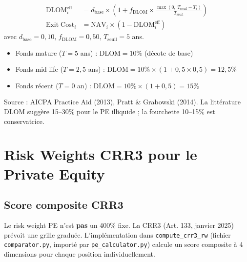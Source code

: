 \documentclass[12pt,a4paper]{article}
\begin{document}
\begin{formulebox}
\begin{align}
\mathrm{DLOM}_i^{\mathrm{eff}} &= d_{\mathrm{base}} \times \left(1 + f_{\mathrm{DLOM}} \times \frac{\max(0,\; T_{\mathrm{seuil}} - T_i)}{T_{\mathrm{seuil}}}\right) \label{eq:dlom}\\[6pt]
\mathrm{Exit\;Cost}_i &= \mathrm{NAV}_i \times (1 - \mathrm{DLOM}_i^{\mathrm{eff}}) \label{eq:exit_cost}
\end{align}
avec $d_{\mathrm{base}} = 0{,}10$, $f_{\mathrm{DLOM}} = 0{,}50$, $T_{\mathrm{seuil}} = 5$ ans.
\end{formulebox}

\begin{interpretbox}
\begin{itemize}[nosep]
    \item Fonds mature ($T = 5$ ans) : $\mathrm{DLOM} = 10\%$ (d\'{e}cote de base)
    \item Fonds mid-life ($T = 2{,}5$ ans) : $\mathrm{DLOM} = 10\% \times (1 + 0{,}5 \times 0{,}5) = 12{,}5\%$
    \item Fonds r\'{e}cent ($T = 0$ an) : $\mathrm{DLOM} = 10\% \times (1 + 0{,}5) = 15\%$
\end{itemize}
Source : AICPA Practice Aid (2013), Pratt \& Grabowski (2014). La litt\'{e}rature
DLOM sugg\`{e}re 15--30\% pour le PE illiquide ; la fourchette 10--15\% est conservatrice.
\end{interpretbox}


\section{Risk Weights CRR3 pour le Private Equity}
\label{sec:crr3}

\subsection{Score composite CRR3}

Le risk weight PE n'est \textbf{pas} un 400\% fixe. La CRR3 (Art. 133, janvier 2025)
pr\'{e}voit une grille gradu\'{e}e. L'impl\'{e}mentation dans \texttt{compute\_crr3\_rw}
(fichier \texttt{comparator.py}, import\'{e} par \texttt{pe\_calculator.py}) calcule un score
composite \`{a} 4 dimensions pour chaque position individuellement.
\end{document}
